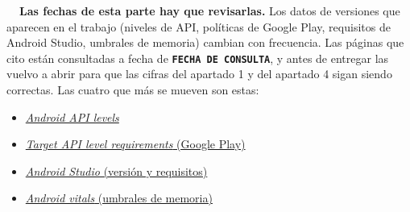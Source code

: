 \documentclass[11pt,a4paper]{article}
\begin{document}
	\begin{warnbox}
		\textbf{\color{accent!80!black}\faExclamationTriangle\ \ Las fechas de esta parte hay que revisarlas.}
		Los datos de versiones que aparecen en el trabajo (niveles de API, políticas de Google Play,
		requisitos de Android Studio, umbrales de memoria) cambian con frecuencia. Las páginas que cito
		están consultadas a fecha de \textbf{\texttt{FECHA DE CONSULTA}}, y antes de entregar las vuelvo
		a abrir para que las cifras del apartado 1 y del apartado 4 sigan siendo correctas. Las cuatro que
		más se mueven son estas:
		\begin{itemize}[leftmargin=*,itemsep=0.15em,topsep=0.2em]
			\item \href{https://developer.android.com/tools/releases/platforms}{\emph{Android API levels}}
			\item \href{https://support.google.com/googleplay/android-developer/answer/11926878}{\emph{Target API level requirements} (Google Play)}
			\item \href{https://developer.android.com/studio}{\emph{Android Studio} (versión y requisitos)}
			\item \href{https://developer.android.com/topic/performance/vitals}{\emph{Android vitals} (umbrales de memoria)}
		\end{itemize}
	\end{warnbox}
	
\end{document}
